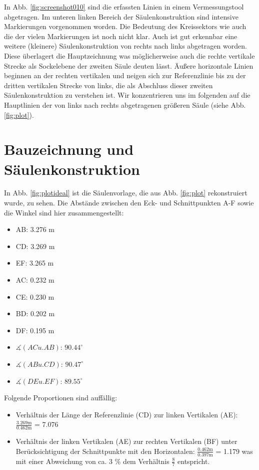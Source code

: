 \documentclass[twocolumn]{bmcart}
\begin{document}
In Abb. \ref{fig:screenshot010} sind die erfassten Linien in einem Vermessungstool abgetragen. Im unteren linken Bereich der Säulenkonstruktion sind intensive Markierungen vorgenommen worden. Die Bedeutung des Kreissektors wie auch die der vielen Markierungen ist noch nicht klar. Auch ist gut erkennbar eine weitere (kleinere) Säulenkonstruktion von rechts nach links abgetragen worden. Diese überlagert die Hauptzeichnung was möglicherweise auch die rechte vertikale Strecke als Sockelebene der zweiten Säule deuten lässt. Äußere horizontale Linien beginnen an der rechten vertikalen und neigen sich zur Referenzlinie bis zu der dritten vertikalen Strecke von links, die als Abschluss dieser zweiten Säulenkonstruktion zu verstehen ist. Wir konzentrieren uns im folgenden auf die Hauptlinien der von links nach rechts abgetragenen größeren Säule (siehe Abb. \ref{fig:plot}).  		
\section{Bauzeichnung und Säulenkonstruktion}

In Abb. \ref{fig:plotideal} ist die Säulenvorlage, die aus Abb. \ref{fig:plot} rekonstruiert wurde, zu sehen. 
Die Abstände zwischen den Eck- und Schnittpunkten A-F sowie die Winkel sind hier zusammengestellt:

\begin{itemize}
\item AB: 3.276 m
\item CD: 3.269 m
\item EF: 3.265 m
\item AC: 0.232 m
\item CE: 0.230 m
\item BD: 0.202 m
\item DF: 0.195 m
\item $\measuredangle{(AC u. AB)}$: $\mathrm{90.44}^\circ$
\item $\measuredangle{(AB u. CD)}$: $\mathrm{90.47}^\circ$
\item $\measuredangle{(DE u. EF)}$: $\mathrm{89.55}^\circ$
\end{itemize}

Folgende Proportionen sind auffällig:

\begin{itemize}
\item Verhältnis der Länge der Referenzlinie (CD) zur linken Vertikalen (AE): $\frac{3.269 \mathrm{m}}{0.462 \mathrm{m}}$ = 7.076
\item Verhältnis der linken Vertikalen (AE) zur rechten Vertikalen (BF) unter Berücksichtigung der \linebreak Schnittpunkte mit den Horizontalen: $\frac{0.462 \mathrm{m}}{0.397 \mathrm{m}}$  = 1.179 was mit einer Abweichung von ca. 3 $\%$ dem Verhältnis $\frac{8}{7}$ entspricht.
\end{itemize}
\end{document}
